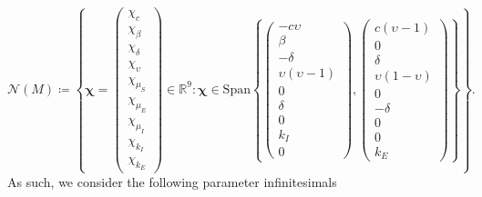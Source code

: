 \documentclass[12pt]{article}
\begin{document}
\begin{equation}    
\mathcal{N}(M)\coloneqq\left\{\boldsymbol{\chi}=\begin{pmatrix}\chi_{c}\\\chi_{\beta}\\\chi_{\delta}\\\chi_{\upsilon}\\\chi_{\mu_{S}}\\\chi_{\mu_{E}}\\\chi_{\mu_{I}}\\\chi_{k_{I}}\\\chi_{k_{E}}\end{pmatrix}\in\mathbb{R}^{9}:\boldsymbol{\chi}\in\mathrm{Span}\left\{\begin{pmatrix}- c \upsilon\\\beta\\- \delta\\\upsilon \left(\upsilon - 1\right)\\0\\\delta\\0\\k_{I}\\0\end{pmatrix},\begin{pmatrix}c \left(\upsilon - 1\right)\\0\\\delta\\\upsilon \left(1 - \upsilon\right)\\0\\- \delta\\0\\0\\k_{E}\end{pmatrix}\right\}\right\}.
\end{equation}
As such, we consider the following parameter infinitesimals
\end{document}
